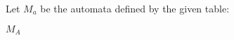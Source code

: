 Let $M_a$ be the automata defined by the given table:
\begin{automata}{$M_A$}
	
	
	
	
	
	
	
	
\end{automata}